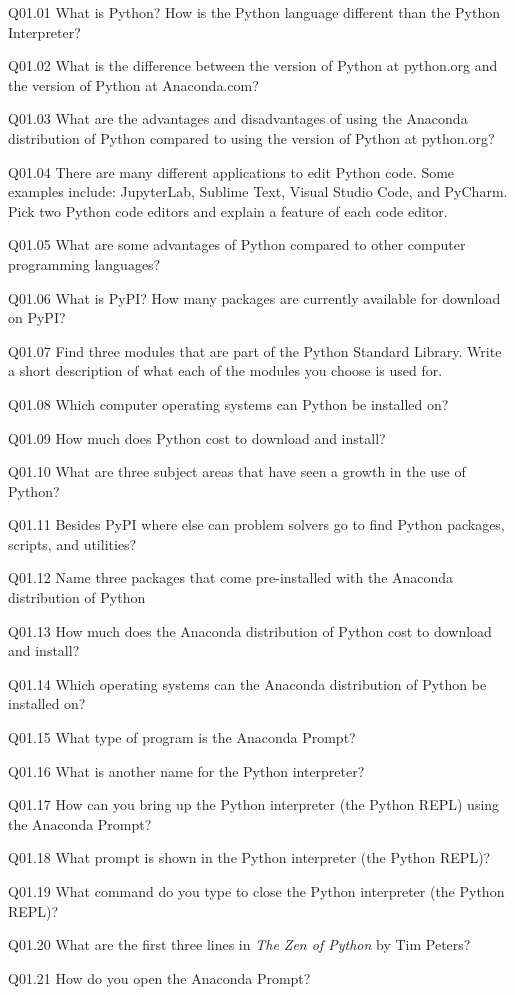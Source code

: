 \documentclass{book}
\newenvironment{problems}{}{}  %
\begin{document}
    
        \begin{problems}
        Q01.01 What is Python? How is the Python language different than the
Python Interpreter?

Q01.02 What is the difference between the version of Python at
python.org and the version of Python at Anaconda.com?

Q01.03 What are the advantages and disadvantages of using the Anaconda
distribution of Python compared to using the version of Python at
python.org?

Q01.04 There are many different applications to edit Python code. Some
examples include: JupyterLab, Sublime Text, Visual Studio Code, and
PyCharm. Pick two Python code editors and explain a feature of each code
editor.

Q01.05 What are some advantages of Python compared to other computer
programming languages?

Q01.06 What is PyPI? How many packages are currently available for
download on PyPI?

Q01.07 Find three modules that are part of the Python Standard Library.
Write a short description of what each of the modules you choose is used
for.

Q01.08 Which computer operating systems can Python be installed on?

Q01.09 How much does Python cost to download and install?

Q01.10 What are three subject areas that have seen a growth in the use
of Python?

Q01.11 Besides PyPI where else can problem solvers go to find Python
packages, scripts, and utilities?

Q01.12 Name three packages that come pre-installed with the Anaconda
distribution of Python

Q01.13 How much does the Anaconda distribution of Python cost to
download and install?

Q01.14 Which operating systems can the Anaconda distribution of Python
be installed on?

Q01.15 What type of program is the Anaconda Prompt?

Q01.16 What is another name for the Python interpreter?

Q01.17 How can you bring up the Python interpreter (the Python REPL)
using the Anaconda Prompt?

Q01.18 What prompt is shown in the Python interpreter (the Python REPL)?

Q01.19 What command do you type to close the Python interpreter (the
Python REPL)?

Q01.20 What are the first three lines in \emph{The Zen of Python} by Tim
Peters?

Q01.21 How do you open the Anaconda Prompt?
        \end{problems}
\end{document}
